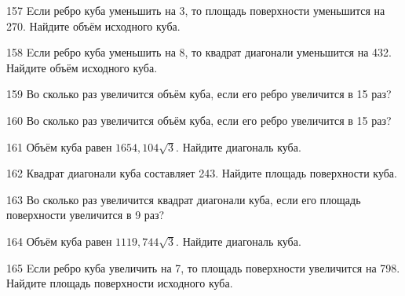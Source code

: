 \begin{taskBN}{157}
Eсли ребро куба уменьшить на 3, то площадь поверхности уменьшится на 270. Найдите объём исходного куба.
\end{taskBN}

\begin{taskBN}{158}
Eсли ребро куба уменьшить на 8, то квадрат диагонали уменьшится на 432. Найдите объём исходного куба.
\end{taskBN}

\begin{taskBN}{159}
Во сколько раз увеличится объём куба, если его ребро увеличится в 15 раз?
\end{taskBN}

\begin{taskBN}{160}
Во сколько раз увеличится объём куба, если его ребро увеличится в 15 раз?
\end{taskBN}

\begin{taskBN}{161}
Объём куба равен $1654,104\sqrt{3}$. Найдите диагональ куба.
\end{taskBN}

\begin{taskBN}{162}
Квадрат диагонали куба составляет 243. Найдите площадь поверхности куба.
\end{taskBN}

\begin{taskBN}{163}
Во сколько раз увеличится квадрат диагонали куба, если его площадь поверхности увеличится в 9 раз?
\end{taskBN}

\begin{taskBN}{164}
Объём куба равен $1119,744\sqrt{3}$. Найдите диагональ куба.
\end{taskBN}

\begin{taskBN}{165}
Eсли ребро куба увеличить на 7, то площадь поверхности увеличится на 798. Найдите площадь поверхности исходного куба.
\end{taskBN}


